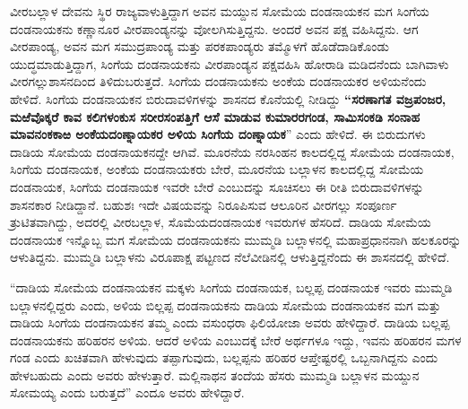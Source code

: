 ವೀರಬಲ್ಲಾಳ ದೇವನು ಸ್ಥಿರ ರಾಜ್ಯವಾಳುತ್ತಿದ್ದಾಗ ಅವನ ಮಯ್ದುನ ಸೋಮೆಯ ದಂಡನಾಯಕನ ಮಗ ಸಿಂಗೆಯ ದಂಡನಾಯಕನು ಕಣ್ಣಾನೂರ ವೀರಪಾಂಡ್ಯನನ್ನು ವೋಲಗಿಸುತ್ತಿದ್ದನು. ಅಂದರೆ ಅವನ ಪಕ್ಷ ವಹಿಸಿದ್ದನು. ಆಗ ವೀರಪಾಂಡ್ಯ, ಅವನ ಮಗ ಸಮುದ್ರಪಾಂಡ್ಯ ಮತ್ತು ಪರಕಪಾಂಡ್ಯರು ತಮ್ಮೊಳಗೆ ಹೊಡೆದಾಡಿಕೊಂಡು ಯುದ್ಧಮಾಡುತ್ತಿದ್ದಾಗ, ಸಿಂಗೆಯ ದಂಡನಾಯಕನು ವೀರಪಾಂಡ್ಯನ ಪಕ್ಷವಹಿಸಿ ಹೋರಾಡಿ ಮಡಿದನೆಂದು ಬಾಗಿವಾಳು ವೀರಗಲ್ಲುಶಾಸನದಿಂದ ತಿಳಿದುಬರುತ್ತದೆ. ಸಿಂಗೆಯ ದಂಡನಾಯಕನು ಅಂಕೆಯ ದಂಡನಾಯಕರ ಅಳಿಯನೆಂದು ಹೇಳಿದೆ. ಸಿಂಗೆಯ ದಂಡನಾಯಕನ ಬಿರುದಾವಳಿಗಳನ್ನು ಶಾಸನದ ಕೊನೆಯಲ್ಲಿ ನೀಡಿದ್ದು \textbf{“ಸರಣಾಗತ ವಜ್ರಪಂಜರ, ಮಱೆವೊಕ್ಕರೆ ಕಾವ ಕಲಿಗಳಂಕುಸ ಸರೀರಸಂಪತ್ತಿಗೆ ಆಸೆ ಮಾಡುವ ಕುಮಾರರಗಂಡ, ಸಾಮಿಸಂಕಡಿ ಸಂನಾಹ ಮಾವನಂಕಕಾಱ ಅಂಕೆಯದಂಣ್ನಾಯಕರ ಅಳಿಯ ಸಿಂಗೆಯ ದಂಣ್ನಾಯಕ}” ಎಂದು ಹೇಳಿದೆ. ಈ ಬಿರುದುಗಳು ದಾಡಿಯ ಸೋಮೆಯ ದಂಡನಾಯಕನದ್ದೇ ಆಗಿವೆ. ಮೂರನೆಯ ನರಸಿಂಹನ ಕಾಲದಲ್ಲಿದ್ದ ಸೋಮೆಯ ದಂಡನಾಯಕ, ಸಿಂಗೆಯ ದಂಡನಾಯಕ, ಅಂಕೆಯ ದಂಡನಾಯಕರು ಬೇರೆ, ಮೂರನೆಯ ಬಲ್ಲಾಳನ ಕಾಲದಲ್ಲಿದ್ದ ಸೋಮೆಯ ದಂಡನಾಯಕ, ಸಿಂಗೆಯ ದಂಡನಾಯಕ ಇವರೇ ಬೇರೆ ಎಂಬುದನ್ನು ಸೂಚಿಸಲು ಈ ರೀತಿ ಬಿರುದಾವಳಿಗಳನ್ನು ಶಾಸನಕಾರ ನೀಡಿದ್ದಾನೆ. ಬಹುಶಃ ಇದೇ ವಿಷಯವನ್ನು ನಿರೂಪಿಸುವ ಆಲೂರಿನ ವೀರಗಲ್ಲು ಸಂಪೂರ್ಣ ತ್ರುಟಿತವಾಗಿದ್ದು, ಅದರಲ್ಲಿ ವೀರಬಲ್ಲಾಳ, ಸೊಮೆಯದಂಡನಾಯಕ ಇವರುಗಳ ಹೆಸರಿದೆ. ದಾಡಿಯ ಸೋಮೆಯ ದಂಡನಾಯಕ ಇನ್ನೊಬ್ಬ ಮಗ ಸೋಮೆಯ ದಂಡನಾಯಕನು ಮುಮ್ಮಡಿ ಬಲ್ಲಾಳನಲ್ಲಿ ಮಹಾಪ್ರಧಾನನಾಗಿ ಹಲಕೂರನ್ನು ಆಳುತಿದ್ದನು. ಮುಮ್ಮಡಿ ಬಲ್ಲಾಳನು ವಿರೂಪಾಕ್ಷ ಪಟ್ಟಣದ ನೆಲೆವೀಡಿನಲ್ಲಿ ಆಳುತ್ತಿದ್ದನೆಂದು ಈ ಶಾಸನದಲ್ಲಿ ಹೇಳಿದೆ.

\vskip 2pt

“ದಾಡಿಯ ಸೋಮೆಯ ದಂಡನಾಯಕನ ಮಕ್ಕಳು ಸಿಂಗೆಯ ದಂಡನಾಯಕ, ಬಲ್ಲಪ್ಪ ದಂಡನಾಯಕ ಇವರು ಮುಮ್ಮಡಿ ಬಲ್ಲಾಳನಲ್ಲಿದ್ದರು ಎಂದು, ಅಳಿಯ ಬಿಲ್ಲಪ್ಪ ದಂಡನಾಯಕನು ದಾಡಿಯ ಸೋಮೆಯ ದಂಡನಾಯಕನ ಮಗ ಮತ್ತು ದಾಡಿಯ ಸಿಂಗೆಯ ದಂಡನಾಯಕನ ತಮ್ಮ ಎಂದು ವಸುಂಧರಾ ಫಿಲಿಯೋಜಾ ಅವರು ಹೇಳಿದ್ದಾರೆ. ದಾಡಿಯ ಬಲ್ಲಪ್ಪ ದಂಡನಾಯಕನು ಹರಿಹರನ ಅಳಿಯ. ಆದರೆ ಅಳಿಯ ಎಂಬುದಕ್ಕೆ ಬೇರೆ ಅರ್ಥಗಳೂ ಇದ್ದು, ಇವನು ಹರಿಹರನ ಮಗಳ ಗಂಡ ಎಂದು ಖಚಿತವಾಗಿ ಹೇಳುವುದು ತಪ್ಪಾಗುವುದು, ಬಲ್ಲಪ್ಪನು ಹರಿಹರ ಆಪ್ತೇಷ್ಟರಲ್ಲಿ ಒಬ್ಬನಾಗಿದ್ದನು ಎಂದು ಹೇಳಬಹುದು ಎಂದು ಅವರು ಹೇಳುತ್ತಾರೆ. ಮಲ್ಲಿನಾಥನ ತಂದೆಯ ಹೆಸರು ಮುಮ್ಮಡಿ ಬಲ್ಲಾಳನ ಮಯ್ದುನ ಸೋಮಯ್ಯ ಎಂದು ಬರುತ್ತದೆ” ಎಂದೂ ಅವರು ಹೇಳಿದ್ದಾರೆ.

\vskip 2pt

